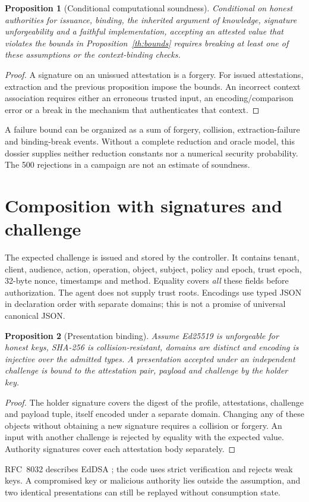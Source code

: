 \documentclass[11pt,a4paper]{article}
\newtheorem{theorem}{Proposition}
\begin{document}
\begin{theorem}[Conditional computational soundness]
Conditional on honest authorities for issuance, binding, the inherited
argument of knowledge, signature unforgeability and a faithful implementation,
accepting an attested value that violates the bounds in
Proposition~\ref{th:bounds} requires breaking at least one of these assumptions
or the context-binding checks.
\end{theorem}
\begin{proof}
A signature on an unissued attestation is a forgery.
For issued attestations, extraction and the previous proposition impose
the bounds. An incorrect context association requires either an erroneous
trusted input, an encoding/comparison error or a break in the mechanism
that authenticates that context.
\end{proof}
A failure bound can be organized as a sum of forgery, collision,
extraction-failure and binding-break events.
Without a complete reduction and oracle model, this dossier supplies neither
reduction constants nor a numerical security probability. The 500 rejections
in a campaign are not an estimate of soundness.

\section{Composition with signatures and challenge}
The expected challenge is issued and stored by the controller. It contains
tenant, client, audience, action, operation, object, subject, policy and epoch,
trust epoch, 32-byte nonce, timestamps and method. Equality covers
\emph{all} these fields before authorization. The agent does not supply
trust roots. Encodings use typed JSON in declaration order with separate
domains; this is not a promise of universal canonical JSON.

\begin{theorem}[Presentation binding]
Assume Ed25519 is unforgeable for honest keys, SHA-256 is collision-resistant,
domains are distinct and encoding is injective over the admitted types.
A presentation accepted under an independent challenge is bound to the
attestation pair, payload and challenge by the holder key.
\end{theorem}
\begin{proof}
The holder signature covers the digest of the profile, attestations,
challenge and payload tuple, itself encoded under a separate domain.
Changing any of these objects without obtaining a new signature requires
a collision or forgery. An input with another challenge is rejected by
equality with the expected value. Authority signatures cover each
attestation body separately.
\end{proof}
RFC~8032 describes EdDSA \cite{rfc8032}; the code uses strict verification
and rejects weak keys. A compromised key or malicious authority lies
outside the assumption, and two identical presentations can still be
replayed without consumption state.
\end{document}
